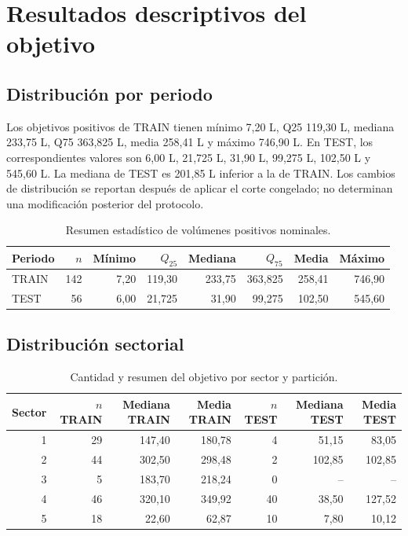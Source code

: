 \documentclass[11pt,letterpaper]{article}
\begin{document}
\section{Resultados descriptivos del objetivo}
\subsection{Distribución por periodo}
Los objetivos positivos de TRAIN tienen mínimo 7,20 L, Q25 119,30 L, mediana 233,75 L, Q75 363,825 L, media 258,41 L y máximo 746,90 L. En TEST, los correspondientes valores son 6,00 L, 21,725 L, 31,90 L, 99,275 L, 102,50 L y 545,60 L. La mediana de TEST es 201,85 L inferior a la de TRAIN. Los cambios de distribución se reportan después de aplicar el corte congelado; no determinan una modificación posterior del protocolo.

\begin{table}[H]
\centering\small
\caption{Resumen estadístico de volúmenes positivos nominales.}\label{tab:dist-target}
\begin{tabular}{lrrrrrrr}
\toprule
Periodo & $n$ & Mínimo & $Q_{25}$ & Mediana & $Q_{75}$ & Media & Máximo\\
\midrule
TRAIN & 142 & 7,20 & 119,30 & 233,75 & 363,825 & 258,41 & 746,90\\
TEST & 56 & 6,00 & 21,725 & 31,90 & 99,275 & 102,50 & 545,60\\
\bottomrule
\end{tabular}
\end{table}

\subsection{Distribución sectorial}
\begin{table}[H]
\centering\small
\caption{Cantidad y resumen del objetivo por sector y partición.}\label{tab:dist-sector}
\begin{tabular}{rrrrrrr}
\toprule
Sector & $n$ TRAIN & Mediana TRAIN & Media TRAIN & $n$ TEST & Mediana TEST & Media TEST\\
\midrule
1 & 29 & 147,40 & 180,78 & 4 & 51,15 & 83,05\\
2 & 44 & 302,50 & 298,48 & 2 & 102,85 & 102,85\\
3 & 5 & 183,70 & 218,24 & 0 & -- & --\\
4 & 46 & 320,10 & 349,92 & 40 & 38,50 & 127,52\\
5 & 18 & 22,60 & 62,87 & 10 & 7,80 & 10,12\\
\bottomrule
\end{tabular}
\end{table}
\end{document}
